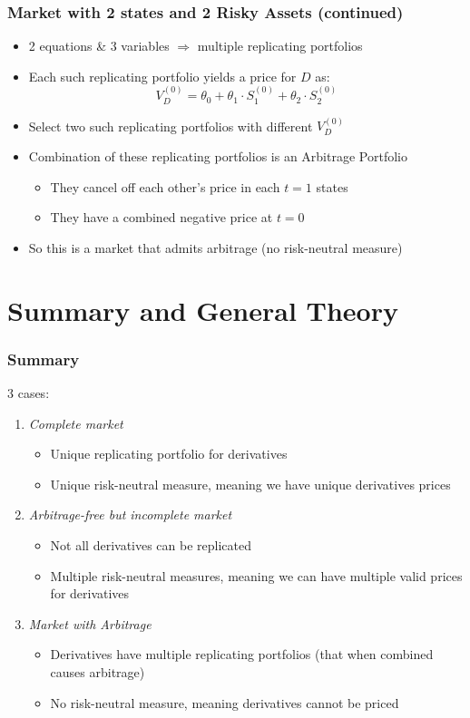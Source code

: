 \documentclass{beamer}
\begin{document}
\begin{frame}
\frametitle{Market with 2 states and 2 Risky Assets (continued)}
\begin{itemize}
\item 2 equations \& 3 variables $\Rightarrow$ multiple replicating portfolios
\item Each such replicating portfolio yields a price for $D$ as:
$$V_D^{(0)} = \theta_0 + \theta_1 \cdot S_1^{(0)} + \theta_2 \cdot S_2^{(0)}$$
\item Select two such replicating portfolios with different $V_D^{(0)}$
\item Combination of these replicating portfolios is an Arbitrage Portfolio
\begin{itemize}
\item They cancel off each other's price in each $t=1$ states
\item They have a combined negative price at $t=0$
\end{itemize}
\item So this is a market that admits arbitrage (no risk-neutral measure)
\end{itemize}
\end{frame}

\section{Summary and General Theory}

\begin{frame}
\frametitle{Summary}
3 cases:
\begin{enumerate}
\item {\em Complete market}
\begin{itemize}
\item Unique replicating portfolio for derivatives
\item Unique risk-neutral measure, meaning we have unique derivatives prices
\end{itemize}
\item {\em Arbitrage-free but incomplete market}
\begin{itemize}
\item Not all derivatives can be replicated
\item Multiple risk-neutral measures, meaning we can have multiple valid prices for derivatives
\end{itemize}
\item {\em Market with Arbitrage}
\begin{itemize}
\item Derivatives have multiple replicating portfolios (that when combined causes arbitrage)
\item No risk-neutral measure, meaning derivatives cannot be priced
\end{itemize}
\end{enumerate}
\end{frame}
\end{document}
